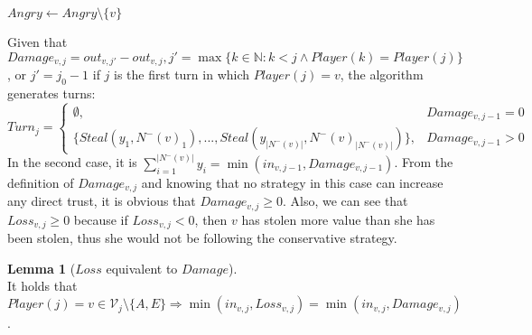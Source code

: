\documentclass[11pt]{article}
\theoremstyle{definition}
\theoremstyle{corollary}
\theoremstyle{lemma}
\newtheorem{lemma}{Lemma}[section]
\begin{document}
\begin{algorithm}[H]
{           
           $Angry \gets Angry \setminus \{v\}$ \\
           }
    \end{algorithm}
    Given that $Damage_{v,j} = out_{v,j'} - out_{v,j}, j' = \max\{k \in \mathbb{N} : k < j \wedge Player(k) =
    Player(j)\}$, or $j' = j_0 - 1$ if $j$ is the first turn in which $Player(j) = v$, the algorithm generates turns:
    $$Turn_j =
      \begin{cases}
         \emptyset, & Damage_{v,j-1} = 0 \\
         \{Steal(y_1,N^{-}(v)_1),...,Steal(y_{|N^{-}(v)|},N^{-}(v)_{|N^{-}(v)|})\}, & Damage_{v,j-1} > 0
      \end{cases}$$
    In the second case, it is $\sum\limits_{i=1}^{|N^{-}(v)|}y_i = \min(in_{v, j-1}, Damage_{v, j-1})$. From the
    definition of $Damage_{v,j}$ and knowing that no strategy in this case can increase any direct trust, it is obvious
    that $Damage_{v,j} \geq 0$. Also, we can see that $Loss_{v,j} \geq 0$
    because if $Loss_{v,j} < 0$, then $v$ has stolen more value than she has been stolen, thus she would not be following the
    conservative strategy.
    \begin{lemma}[$Loss$ equivalent to $Damage$] \ \\
       It holds that $Player(j) = v \in \mathcal{V}_j \setminus \{A, E\}  \Rightarrow \min(in_{v, j}, Loss_{v, j}) = 
       \min(in_{v, j}, Damage_{v, j})$.
    \end{lemma}
\end{document}
